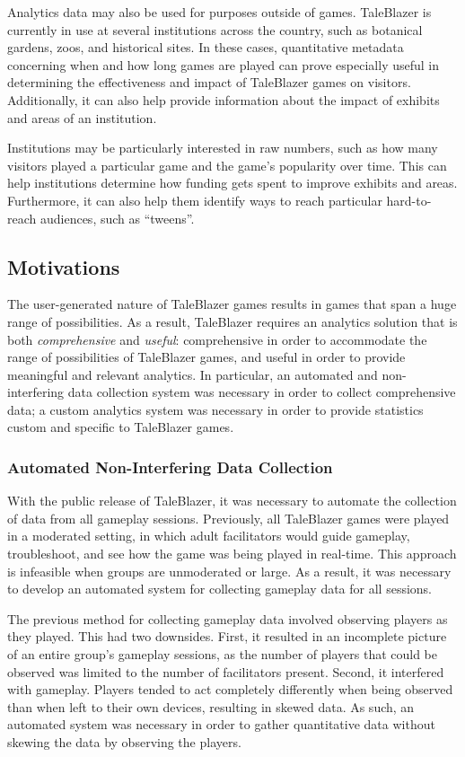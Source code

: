 Analytics data may also be used for purposes outside of games. TaleBlazer is currently in use at several institutions across the country, such as botanical gardens, zoos, and historical sites. In these cases, quantitative metadata concerning when and how long games are played can prove especially useful in determining the effectiveness and impact of TaleBlazer games on visitors. Additionally, it can also help provide information about the impact of exhibits and areas of an institution. 

Institutions may be particularly interested in raw numbers, such as how many visitors played a particular game and the game's popularity over time. This can help institutions determine how funding gets spent to improve exhibits and areas. Furthermore, it can also help them identify ways to reach particular hard-to-reach audiences, such as ``tweens''.

\subsection{Motivations}
The user-generated nature of TaleBlazer games results in games that span a huge range of possibilities. As a result, TaleBlazer requires an analytics solution that is both \textit{comprehensive} and \textit{useful}: comprehensive in order to accommodate the range of possibilities of TaleBlazer games, and useful in order to provide meaningful and relevant analytics. In particular, an automated and non-interfering data collection system was necessary in order to collect comprehensive data; a custom analytics system was necessary in order to provide statistics custom and specific to TaleBlazer games.

\subsubsection{Automated Non-Interfering Data Collection}

With the public release of TaleBlazer, it was necessary to automate the collection of data from all gameplay sessions. Previously, all TaleBlazer games were played in a moderated setting, in which adult facilitators would guide gameplay, troubleshoot, and see how the game was being played in real-time. This approach is infeasible when groups are unmoderated or large. As a result, it was necessary to develop an automated system for collecting gameplay data for all sessions.

The previous method for collecting gameplay data involved observing players as they played. This had two downsides. First, it resulted in an incomplete picture of an entire group's gameplay sessions, as the number of players that could be observed was limited to the number of facilitators present. Second, it interfered with gameplay. Players tended to act completely differently when being observed than when left to their own devices, resulting in skewed data. As such, an automated system was necessary in order to gather quantitative data without skewing the data by observing the players.

